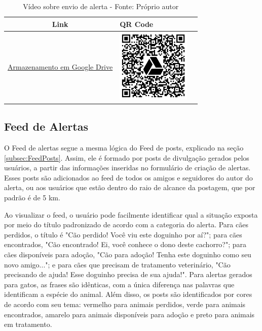 \begin{table}[htbp]
\centering
\renewcommand{\arraystretch}{1.5}
\begin{tabular}{|c|>{\centering\arraybackslash}m{6cm}|c|}
\hline
\textbf{Link} & \textbf{QR Code} \\
\hline
\href{https://drive.google.com/file/d/1s08Vz-h8y9M3bp_4HEkIN2xDcSTKl-AS/view?usp=drive_link}{Armazenamento em Google Drive} & \includegraphics[width=3.5cm]{arquivos/ImgLinks/formularioAlerta.png} \\
\hline
\end{tabular}
\caption*{Vídeo sobre envio de alerta - Fonte: Próprio autor}
\end{table}

\newpage
\subsection{Feed de Alertas}
O Feed de alertas segue a mesma lógica do Feed de posts, explicado na seção \ref{subsec:FeedPosts}. Assim, ele é formado por posts de divulgação gerados pelos usuários, a partir das informações inseridas no formulário de criação de alertas. Esses posts são adicionados ao feed de todos os amigos e seguidores do autor do alerta, ou aos usuários que estão dentro do raio de alcance da postagem, que por padrão é de 5 km.

Ao visualizar o feed, o usuário pode facilmente identificar qual a situação exposta por meio do título padronizado de acordo com a categoria do alerta. Para cães perdidos, o título é "Cão perdido! Você viu este doguinho por aí?"; para cães encontrados, "Cão encontrado! Ei, você conhece o dono deste cachorro?"; para cães disponíveis para adoção, "Cão para adoção! Tenha este doguinho como seu novo amigo..."; e para cães que precisam de tratamento veterinário, "Cão precisando de ajuda! Esse doguinho precisa de sua ajuda!". 	Para alertas gerados para gatos, as frases são idênticas, com a única diferença nas palavras que identificam a espécie do animal. Além disso, os posts são identificados por cores de acordo com seu tema: vermelho para animais perdidos, verde para animais encontrados, amarelo para animais disponíveis para adoção e preto para animais em tratamento.

